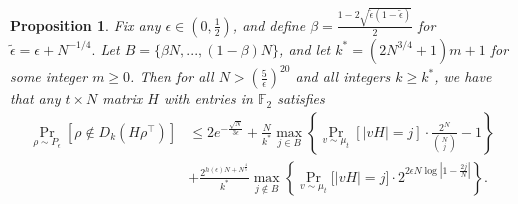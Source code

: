 \documentclass[12pt]{article}
\newtheorem{prop}[theorem]{Proposition}
\begin{document}
\begin{prop}\label{weightcriterion}
Fix any $\epsilon\in(0,\frac{1}{2})$, and define 
$\beta=\frac{1-2\sqrt{\tilde{\epsilon}(1-\tilde{\epsilon})}}{2}$ for
$\tilde{\epsilon}=\epsilon+N^{-1/4}.$
Let $B=\{\beta N,...,(1-\beta)N\} $, and let $k^*=(2N^{3/4}+1)m+1$ for some integer $m\geq 0$.
Then for all $N> \left(\frac{5}{\epsilon}\right)^{20}$ and all integers $k\geq k^*$, we have that any $t\times N$ matrix $H$ with entries in $\mathbb{F}_2$ satisfies
\begin{align*}
\Pr_{\rho\sim P_\epsilon}[\rho\notin D_k(H\rho^\intercal)]&\leq 2e^{-\frac{\sqrt{N}}{3\epsilon}}+\frac{N}{k^*} \max_{j\in B}\left\{ \Pr_{v\sim \mu_t}[|v H|=j] \cdot \frac{2^N}{\binom{N}{j}}-1\right\} \nonumber\\
&+\frac{2^{h(\epsilon)N+N^{\frac{4}{5}}}}{k^*}  \max_{ j\notin B}\left\{ \Pr_{v\sim \mu_t}\big[|v H|=j\big]\cdot  2^{2\epsilon N\log|1-\frac{2j}{N}|} \right\}.
\end{align*}
\end{prop}
\end{document}
